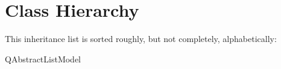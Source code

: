 \section{Class Hierarchy}
This inheritance list is sorted roughly, but not completely, alphabetically\+:\begin{DoxyCompactList}
\item Q\+Abstract\+List\+Model\begin{DoxyCompactList}
\item {}
\end{DoxyCompactList}
\end{DoxyCompactList}
